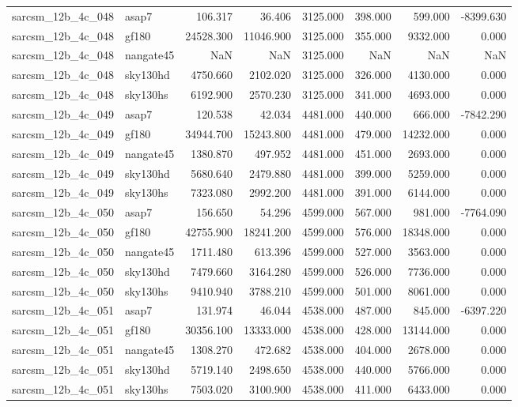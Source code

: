 \begin{tabular}{llrrrrrr}
sarcsm\_12b\_4c\_048 & asap7 & 106.317 & 36.406 & 3125.000 & 398.000 & 599.000 & -8399.630 \\
sarcsm\_12b\_4c\_048 & gf180 & 24528.300 & 11046.900 & 3125.000 & 355.000 & 9332.000 & 0.000 \\
sarcsm\_12b\_4c\_048 & nangate45 & NaN & NaN & 3125.000 & NaN & NaN & NaN \\
sarcsm\_12b\_4c\_048 & sky130hd & 4750.660 & 2102.020 & 3125.000 & 326.000 & 4130.000 & 0.000 \\
sarcsm\_12b\_4c\_048 & sky130hs & 6192.900 & 2570.230 & 3125.000 & 341.000 & 4693.000 & 0.000 \\
sarcsm\_12b\_4c\_049 & asap7 & 120.538 & 42.034 & 4481.000 & 440.000 & 666.000 & -7842.290 \\
sarcsm\_12b\_4c\_049 & gf180 & 34944.700 & 15243.800 & 4481.000 & 479.000 & 14232.000 & 0.000 \\
sarcsm\_12b\_4c\_049 & nangate45 & 1380.870 & 497.952 & 4481.000 & 451.000 & 2693.000 & 0.000 \\
sarcsm\_12b\_4c\_049 & sky130hd & 5680.640 & 2479.880 & 4481.000 & 399.000 & 5259.000 & 0.000 \\
sarcsm\_12b\_4c\_049 & sky130hs & 7323.080 & 2992.200 & 4481.000 & 391.000 & 6144.000 & 0.000 \\
sarcsm\_12b\_4c\_050 & asap7 & 156.650 & 54.296 & 4599.000 & 567.000 & 981.000 & -7764.090 \\
sarcsm\_12b\_4c\_050 & gf180 & 42755.900 & 18241.200 & 4599.000 & 576.000 & 18348.000 & 0.000 \\
sarcsm\_12b\_4c\_050 & nangate45 & 1711.480 & 613.396 & 4599.000 & 527.000 & 3563.000 & 0.000 \\
sarcsm\_12b\_4c\_050 & sky130hd & 7479.660 & 3164.280 & 4599.000 & 526.000 & 7736.000 & 0.000 \\
sarcsm\_12b\_4c\_050 & sky130hs & 9410.940 & 3788.210 & 4599.000 & 501.000 & 8061.000 & 0.000 \\
sarcsm\_12b\_4c\_051 & asap7 & 131.974 & 46.044 & 4538.000 & 487.000 & 845.000 & -6397.220 \\
sarcsm\_12b\_4c\_051 & gf180 & 30356.100 & 13333.000 & 4538.000 & 428.000 & 13144.000 & 0.000 \\
sarcsm\_12b\_4c\_051 & nangate45 & 1308.270 & 472.682 & 4538.000 & 404.000 & 2678.000 & 0.000 \\
sarcsm\_12b\_4c\_051 & sky130hd & 5719.140 & 2498.650 & 4538.000 & 440.000 & 5766.000 & 0.000 \\
sarcsm\_12b\_4c\_051 & sky130hs & 7503.020 & 3100.900 & 4538.000 & 411.000 & 6433.000 & 0.000 \\

\end{tabular}

